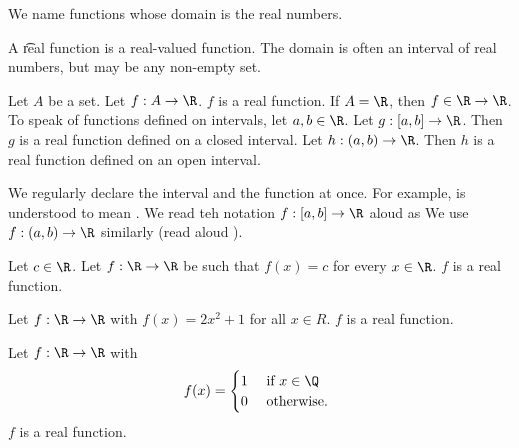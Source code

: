 

We name functions whose domain is the real numbers.


A \t{real function} is a real-valued function.
The domain is often an interval of real numbers, but may be any non-empty set.


Let $A$ be a set.
Let $f: A \to \R$.
$f$ is a real function.
If $A = \R$, then $f \in \R \to \R$.
To speak of functions defined on intervals, let $a, b \in \R$.
Let $g: [a, b] \to \R$.
Then $g$ is a real function defined on a closed interval.
Let $h: (a, b) \to \R$.
Then $h$ is a real function defined on an open interval.

We regularly declare the interval and the function at once.
For example,
 is understood to mean .
We read teh notation $f: [a, b] \to \R$ aloud as 
We use $f: (a, b) \to \R$ similarly (read aloud ).


\begin{expl}
Let $c \in \R$.
Let $f: \R \to \R$ be such that
$f(x) = c$ for every $x \in \R$.
$f$ is a real function.
\end{expl}

\begin{expl}
\item Let $f: \R \to \R$ with $f(x) = 2x^2 + 1$ for all $x \in R$.
$f$ is a real function.
\end{expl}

\begin{expl}
  Let $f: \R \to \R$ with
  \[
    f(x) = \begin{cases}
      1 & \text{ if } x \in \Q \\
      0 & \text{ otherwise. }
    \end{cases}
  \]
$f$ is a real function.
\end{expl}

